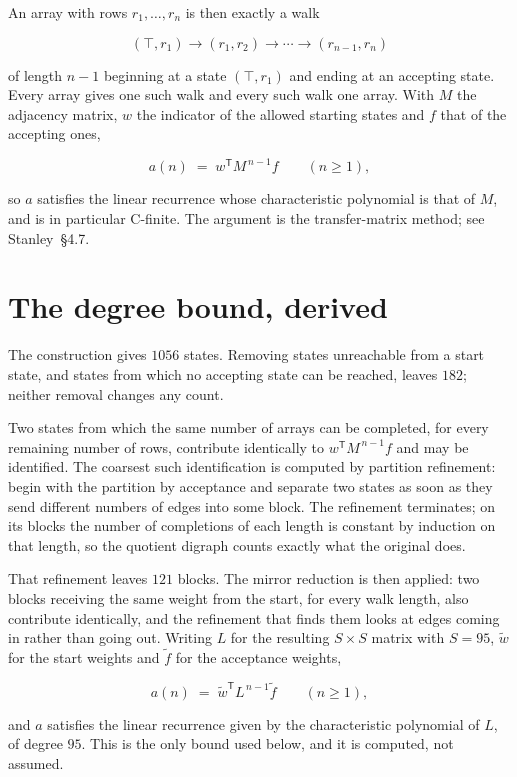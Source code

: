 \documentclass[11pt]{article}
\theoremstyle{definition}
\begin{document}
An array with rows $r_1,\dots,r_n$ is then exactly a walk

\[(\top,r_1) \to (r_1,r_2) \to \cdots \to (r_{n-1},r_n)\]

of length $n-1$ beginning at a state $(\top,r_1)$ and ending at an accepting state. Every array gives one such walk and every such walk one array. With $M$ the adjacency matrix, $w$ the indicator of the allowed starting states and $f$ that of the accepting ones,

\[a(n) \;=\; w^{\mathsf T} M^{\,n-1} f \qquad (n \ge 1),\]

so $a$ satisfies the linear recurrence whose characteristic polynomial is that of $M$, and is in particular C-finite. The argument is the transfer-matrix method; see Stanley~\S4.7.

\section{The degree bound, derived}

The construction gives $1056$ states. Removing states unreachable from a start state, and states from which no accepting state can be reached, leaves $182$; neither removal changes any count.

Two states from which the same number of arrays can be completed, for every remaining number of rows, contribute identically to $w^{\mathsf T}M^{\,n-1}f$ and may be identified. The coarsest such identification is computed by partition refinement: begin with the partition by acceptance and separate two states as soon as they send different numbers of edges into some block. The refinement terminates; on its blocks the number of completions of each length is constant by induction on that length, so the quotient digraph counts exactly what the original does.

That refinement leaves $121$ blocks. The mirror reduction is then applied: two blocks receiving the same weight from the start, for every walk length, also contribute identically, and the refinement that finds them looks at edges coming in rather than going out. Writing $L$ for the resulting $S \times S$ matrix with $S = 95$, $\tilde w$ for the start weights and $\tilde f$ for the acceptance weights,

\[a(n) \;=\; \tilde w^{\mathsf T} L^{\,n-1} \tilde f \qquad (n \ge 1),\]

and $a$ satisfies the linear recurrence given by the characteristic polynomial of $L$, of degree $95$. This is the only bound used below, and it is computed, not assumed.
\end{document}
